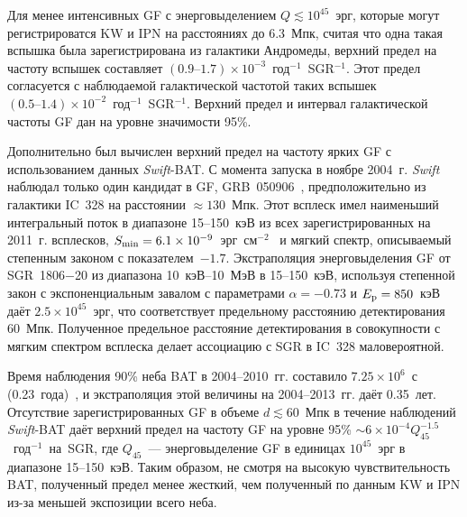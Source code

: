 Для менее интенсивных GF с энерговыделением $Q \lesssim 10^{45}$~эрг, которые 
могут регистрироватся KW и IPN на расстояниях до 6.3~Мпк, считая что 
одна такая вспышка была зарегистрирована из галактики Андромеды, верхний предел 
на частоту вспышек составляет
${(0.9\textrm{--}1.7)\times 10^{-3}}$~год$^{-1}$~SGR$^{-1}$. Этот предел согласуется
с наблюдаемой галактической частотой таких вспышек 
${(0.5\textrm{--}1.4)\times 10^{-2}}$~год$^{-1}$~SGR$^{-1}$. Верхний предел и 
интервал галактической частоты GF дан на уровне значимости 95\%.

Дополнительно был вычислен верхний предел на частоту ярких GF с использованием 
данных \textit{Swift}-BAT. С момента запуска в ноябре 2004~г. \textit{Swift} наблюдал 
только один кандидат в GF, GRB~050906~\citep{Levan2008}, предположительно из 
галактики IC~328 на расстоянии $\approx 130$~Мпк. Этот всплеск имел наименьший 
интегральный поток в диапазоне 15--150~кэВ из всех зарегистрированных на 2011~г. всплесков, 
$S_{{\mathrm{min}}} = 6.1\times10^{-9}$~эрг~см$^{-2}$~\citep{Sakamoto2011ApJS} и 
мягкий спектр, описываемый степенным законом с показателем~$-1.7$. Экстраполяция 
энерговыделения GF от SGR~1806$-$20 из диапазона 10~кэВ--10~МэВ в 15--150~кэВ, 
используя степенной закон с экспоненциальным завалом с параметрами $\alpha=-0.73$ 
и $E_{{\mathrm{p}}}=850$~кэВ даёт $2.5\times10^{45}$~эрг, что соответствует предельному 
расстоянию детектирования 60~Мпк. Полученное предельное расстояние детектирования 
в совокупности с мягким спектром всплеска делает ассоциацию с SGR в IC~328 маловероятной.

Время наблюдения 90\% неба BAT в 2004--2010~гг. 
составило $7.25\times10^{6}$~с (0.23~года)~\citep{Baumgartner2013ApJS}, и экстраполяция 
этой величины на 2004--2013~гг. даёт 0.35~лет. Отсутствие зарегистрированных GF в 
объеме $d \lesssim 60$~Мпк в течение наблюдений \textit{Swift}-BAT даёт верхний предел 
на частоту GF на уровне 95\% $\sim 6 \times 10^{-4} Q_{45}^{-1.5} $~год$^{-1}$~на~SGR, 
где $Q_{45}$~--- энерговыделение GF в единицах $10^{45}$~эрг в диапазоне 15--150~кэВ. 
Таким образом, не смотря на высокую чувствительность BAT, полученный предел 
менее жесткий, чем полученный по данным KW и IPN из-за меньшей экспозиции всего неба.

